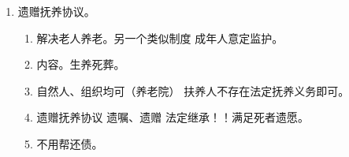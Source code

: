 \begin{enumerate}
\begin{enumerate}
\begin{enumerate}
                  \item 同遗嘱，对象不同而已。60 日、受赠人沉默视为放弃、要式。。
                  \item \bdy 赠与。。
                \end{enumerate}
          \item 遗赠抚养协议。
                \begin{enumerate}
                  \item 解决老人养老。另一个类似制度 \yjt 成年人意定监护。
                  \item 内容。生养死葬。
                  \item 自然人、组织均可（养老院） \yjt 扶养人不存在法定抚养义务即可。
                  \item 遗赠抚养协议 \dy 遗嘱、遗赠 \dy 法定继承！！满足死者遗愿。
                  \item 不用帮还债。
                \end{enumerate}
        \end{enumerate}
\end{enumerate}
